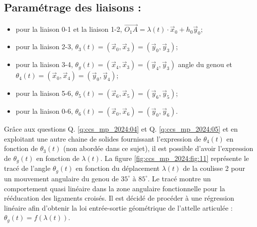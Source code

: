 \subsection*{Paramétrage des liaisons :}
\begin{itemize}
  \item pour la liaison 0-1 et la liaison 1-2, $\overrightarrow{O_{1} A}=\lambda(t) \cdot \vec{x}_{0}+h_{0} \vec{y}_{0}$;
  \item pour la liaison 2-3, $\theta_{3}(t)=\left(\vec{x}_{0}, \vec{x}_{3}\right)=\left(\vec{y}_{0}, \vec{y}_{3}\right)$;
  \item pour la liaison 3-4, $\theta_{g}(t)=\left(\vec{x}_{4}, \vec{x}_{3}\right)=\left(\vec{y}_{4}, \vec{y}_{3}\right)$ angle du genou et $\theta_{4}(t)=\left(\vec{x}_{0}, \vec{x}_{4}\right)=\left(\vec{y}_{0}, \vec{y}_{4}\right)$;
  \item pour la liaison 5-6, $\theta_{5}(t)=\left(\vec{x}_{6}, \vec{x}_{5}\right)=\left(\vec{y}_{6}, \vec{y}_{5}\right)$;
  \item pour la liaison 0-6, $\theta_{6}(t)=\left(\vec{x}_{0}, \vec{x}_{6}\right)=\left(\vec{y}_{0}, \vec{y}_{6}\right)$.
\end{itemize}



Grâce aux questions Q. \ref{q:ccs_mp_2024:04} et Q. \ref{q:ccs_mp_2024:05} et en exploitant une autre chaine de solides fournissant l'expression de $\theta_{4}(t)$ en fonction de $\theta_{3}(t)$ (non abordée dans ce sujet), il est possible d'avoir l'expression de $\theta_{g}(t)$ en fonction de $\lambda(t)$. La figure \ref{fig:ccs_mp_2024:fig:11} représente le tracé de l'angle $\theta_{g}(t)$ en fonction du déplacement $\lambda(t)$ de la coulisse 2 pour un mouvement angulaire du genou de $35^{\circ}$ à $85^{\circ}$. Le tracé montre un comportement quasi linéaire dans la zone angulaire fonctionnelle pour la rééducation des ligaments croisés. Il est décidé de procéder à une régression linéaire afin d'obtenir la loi entrée-sortie géométrique de l'attelle articulée : $\theta_{g}(t)=f(\lambda(t))$.

